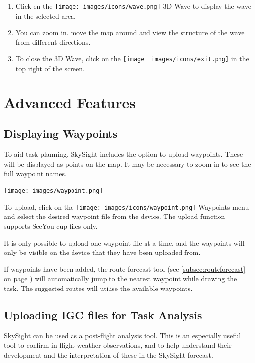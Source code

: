 \documentclass[11pt,a4paper]{article}
\begin{document}
\begin{enumerate}
\item Click on the \texttt{[image: images/icons/wave.png]} 3D Wave to display the wave in the selected area. 
\item You can zoom in, move the map around and view the structure of the wave from different directions.
\item To close the 3D Wave, click on the \texttt{[image: images/icons/exit.png]} in the top right of the screen. 
\end{enumerate}


\section{Advanced Features}
\subsection{Displaying Waypoints}\label{subsec:waypoints}
To aid task planning, SkySight includes the option to upload waypoints. These will be displayed as points on the map.  It may be necessary to zoom in to see the full waypoint names.
\begin{center}
\texttt{[image: images/waypoint.png]}
\end{center}
To upload, click on the \texttt{[image: images/icons/waypoint.png]} Waypoints menu and select the desired waypoint file from the device. The upload function supports SeeYou cup files only.

It is only possible to upload one waypoint file at a time, and the waypoints will only be visible on the device that they have been uploaded from.
\begin{tip}
\item If waypoints have been added, the route forecast tool (see \ref{subsec:routeforecast} on page \pageref{subsec:routeforecast}) will automatically jump to the nearest waypoint while drawing the task. The suggested routes will utilise the available waypoints. 
\end{tip}
\subsection{Uploading IGC files for Task Analysis}
SkySight can be used as a post-flight analysis tool. This is an especially useful tool to confirm in-flight weather observations, and to help understand their development and the interpretation of these in the SkySight forecast.
\end{document}
